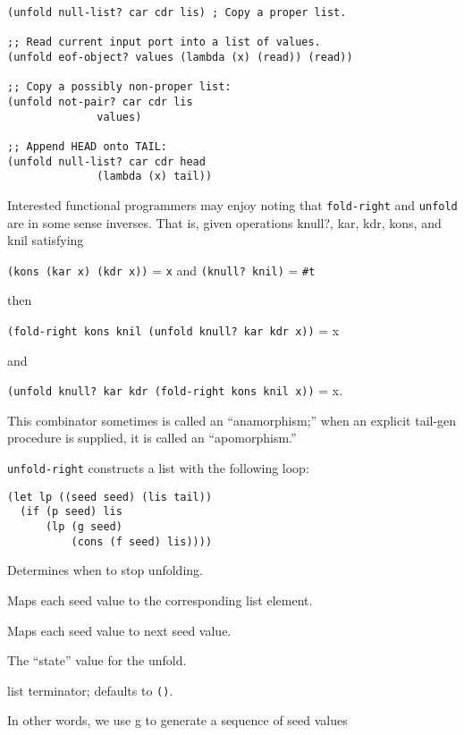 \begin{description}
\begin{verbatim}
(unfold null-list? car cdr lis) ; Copy a proper list.

;; Read current input port into a list of values.
(unfold eof-object? values (lambda (x) (read)) (read))

;; Copy a possibly non-proper list:
(unfold not-pair? car cdr lis 
              values)

;; Append HEAD onto TAIL:
(unfold null-list? car cdr head 
              (lambda (x) tail))
\end{verbatim}

Interested functional programmers may enjoy noting that
\texttt{fold-right} and \texttt{unfold} are in some sense inverses. That
is, given operations knull?, kar, kdr, kons, and knil satisfying

\texttt{(kons\ (kar\ x)\ (kdr\ x))} = \texttt{x} and
\texttt{(knull?\ knil)} = \texttt{\#t}

then

\texttt{(fold-right\ kons\ knil\ (unfold\ knull?\ kar\ kdr\ x))} = x

and

\texttt{(unfold\ knull?\ kar\ kdr\ (fold-right\ kons\ knil\ x))} = x.

This combinator sometimes is called an ``anamorphism;'' when an explicit
tail-gen procedure is supplied, it is called an ``apomorphism.''
\item[ \href{}{} \texttt{unfold-right} p f g seed {[}tail{]}
-\textgreater{} list ]
\texttt{unfold-right} constructs a list with the following loop:

\begin{verbatim}
(let lp ((seed seed) (lis tail))
  (if (p seed) lis
      (lp (g seed)
          (cons (f seed) lis))))
\end{verbatim}

\begin{description}
\tightlist
\item[ p ]
Determines when to stop unfolding.
\item[ f ]
Maps each seed value to the corresponding list element.
\item[ g ]
Maps each seed value to next seed value.
\item[ seed ]
The ``state'' value for the unfold.
\item[ tail ]
list terminator; defaults to \texttt{\textquotesingle{}()}.
\end{description}

In other words, we use g to generate a sequence of seed values


\end{description}
